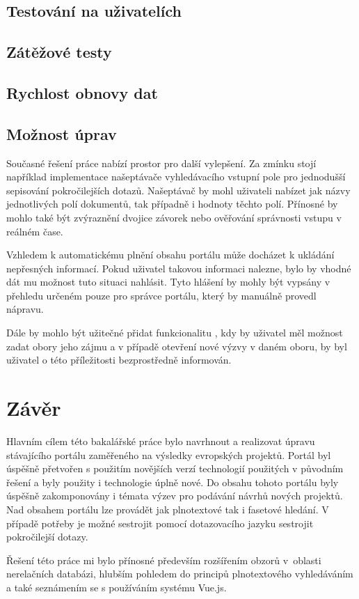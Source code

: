 \section{Testování na uživatelích}
\blindtext[2]

\section{Zátěžové testy}
\blindtext[2]

\section{Rychlost obnovy dat}
\blindtext[2]

\section{Možnost úprav}
Současné řešení práce nabízí prostor pro další vylepšení. Za zmínku stojí například implementace našeptávače vyhledávacího vstupní pole pro jednodušší sepisování pokročilejších dotazů. Našeptávač by mohl uživateli nabízet jak názvy jednotlivých polí dokumentů, tak případně i hodnoty těchto polí. Přínosné by mohlo také být zvýraznění dvojice závorek nebo ověřování správnosti vstupu v reálném čase.

Vzhledem k automatickému plnění obsahu portálu může docházet k ukládání nepřesných informací. Pokud uživatel takovou informaci nalezne, bylo by vhodné dát mu možnost tuto situaci nahlásit. Tyto hlášení by mohly být vypsány v přehledu určeném pouze pro správce portálu, který by manuálně provedl nápravu. 

Dále by mohlo být užitečné přidat funkcionalitu , kdy by uživatel měl možnost zadat obory jeho zájmu a v případě otevření nové výzvy v daném oboru, by byl uživatel o této příležitosti bezprostředně informován.



\chapter{Závěr}
Hlavním cílem této bakalářské práce bylo navrhnout a realizovat úpravu stávajícího portálu zaměřeného na výsledky evropských projektů. Portál byl úspěšně přetvořen s použitím novějších verzí technologií použitých v původním řešení a byly použity i technologie úplně nové. Do obsahu tohoto portálu byly úspěšně zakomponovány i témata výzev pro podávání návrhů nových projektů. Nad obsahem portálu lze provádět jak plnotextové tak i fasetové hledání. V případě potřeby je možné sestrojit pomocí dotazovacího jazyku sestrojit pokročilejší dotazy.

\blindtext %

Řešení této práce mi bylo přínosné především rozšířením obzorů v~oblasti nerelačních databázi, hlubším pohledem do principů plnotextového vyhledáváním a také seznámením se s používáním systému Vue.js.